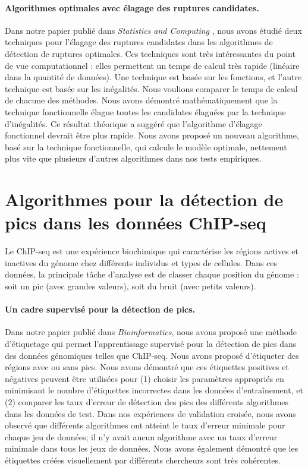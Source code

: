 \documentclass{article}
\begin{document}
\paragraph{Algorithmes optimales avec élagage des ruptures
  candidates.} Dans notre papier publié dans \emph{Statistics and
  Computing} \citep{fpop}, nous avons étudié deux techniques pour
l'élagage des ruptures candidates dans les algorithmes de détection de
ruptures optimales. Ces techniques sont très intéressantes du point de
vue computationnel : elles permettent un temps de calcul très rapide
(linéaire dans la quantité de données). Une technique est basée sur
les fonctions, et l'autre technique est basée sur les inégalités. Nous
voulions comparer le temps de calcul de chacune des méthodes. Nous avons démontré
mathématiquement que la technique fonctionnelle élague toutes les
candidates élaguées par la technique d'inégalités. Ce résultat
théorique a suggéré que l'algorithme d'élagage fonctionnel devrait
être plus rapide. Nous avons proposé un nouveau algorithme, basé sur
la technique fonctionnelle, qui calcule le modèle optimale, nettement
plus vite que plusieurs d'autres algorithmes dans nos tests
empiriques.

\section{Algorithmes pour la détection de pics dans les données ChIP-seq}
Le ChIP-seq est une expérience biochimique qui caractérise les
régions actives et inactives du génome chez différents individus et
types de cellules. Dans ces données, la principale tâche d'analyse est
de classer chaque position du génome : soit un pic (avec grandes
valeurs), soit du bruit (avec petits valeurs).

\paragraph{Un cadre supervisé pour la détection de pics.} Dans notre
papier publié dans \emph{Bioinformatics}\citep{HOCKING-chipseq}, nous
avons proposé une méthode d'étiquetage qui permet l'apprentissage
supervisé pour la détection de pics dans des données génomiques telles
que ChIP-seq. Nous avons proposé d'étiqueter des régions
avec ou sans pics. Nous avons démontré que ces étiquettes positives et
négatives peuvent être utilisées pour (1) choisir les paramètres
appropriés en minimisant le nombre d'étiquettes incorrectes dans les
données d'entraînement, et (2) comparer les taux d'erreur de détection
des pics des différents algorithmes dans les données de test. Dans nos
expériences de validation croisée, nous avons observé que différents
algorithmes ont atteint le taux d'erreur minimale pour chaque jeu de
données; il n'y avait aucun algorithme avec un taux d'erreur minimale
dans tous les jeux de données. Nous avons également démontré que les
étiquettes créées visuellement par différents chercheurs sont très
cohérentes.
\end{document}

